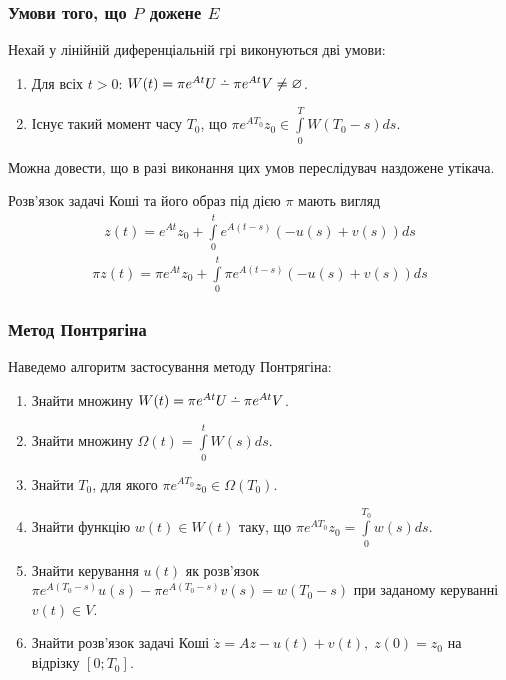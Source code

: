 \documentclass[10pt,pdf]{beamer}
\renewcommand{\d}[1]{\dot{#1}}
\newcommand{\intl}{\int\limits}
\def\setdif{\mathbin{\ooalign{\hss\raise1ex\hbox{.}\hss\cr
  \mathsurround=0pt$-$}}}
\begin{document}
    \begin{frame}
        \frametitle{Умови того, що $P$ дожене $E$}
    
        Нехай у лінійній диференціальній грі виконуються дві умови:
        \begin{enumerate}
            \item Для всіх $t>0$: $W(t) = \pi e^{At}U \setdif \pi e^{At}V \neq \varnothing$.
            \item Існує такий момент часу $T_0$, що $\pi e^{AT_0}z_0 \in \intl_0^T W(T_0 - s)ds$.
        \end{enumerate}

        Можна довести, що в разі виконання цих умов переслідувач наздожене утікача.
    
        Розв'язок задачі Коші та його образ під дією $\pi$ мають вигляд
        \begin{gather*}
            z(t) = e^{A t} z_0 + \intl_0^t e^{A(t-s)} (- u(s) + v(s)) ds
        \end{gather*}
        \begin{gather*}
            \pi z(t) =  \pi e^{A t} z_0 + \intl_0^t \pi e^{A(t-s)} (- u(s) + v(s)) ds
        \end{gather*}
    \end{frame}
    \begin{frame}
        \frametitle{Метод Понтрягіна}
    
        Наведемо алгоритм застосування методу Понтрягіна:
    
        \begin{enumerate}
            \item Знайти множину $W(t) = \pi e^{At}U \setdif \pi e^{At}V$.
            \item Знайти множину $\Omega(t) = \intl_0^t W(s)ds$.
            \item Знайти $T_0$, для якого $\pi e^{A T_0} z_0 \in \Omega(T_0)$.
            \item Знайти функцію $w(t) \in W(t)$ таку, що $\pi e^{A T_0} z_0 = \intl_0^{T_0} w(s) ds$.
            \item Знайти керування $u(t)$ як розв'язок $\pi e^{A (T_0-s)} u(s) - \pi e^{A (T_0-s)} v(s) = w(T_0 - s) $ при заданому керуванні $v(t) \in V$.
            \item Знайти розв'язок задачі Коші $\d{z} = Az - u(t) + v(t), \; z(0) = z_0$ на відрізку $[0; T_0]$.
        \end{enumerate}
    \end{frame}
\end{document}
